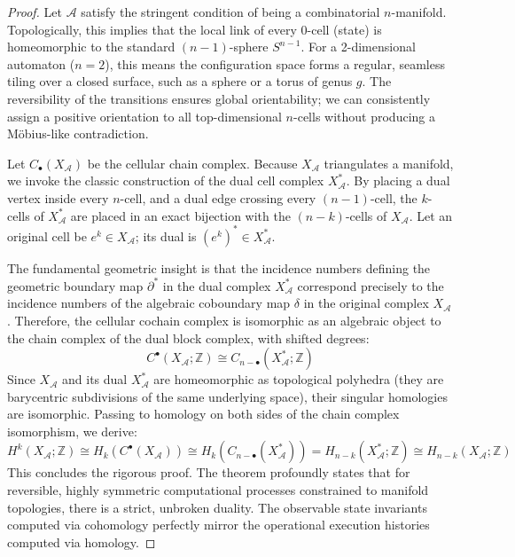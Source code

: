 \begin{proof}
Let $\mathcal{A}$ satisfy the stringent condition of being a combinatorial $n$-manifold. Topologically, this implies that the local link of every 0-cell (state) is homeomorphic to the standard $(n-1)$-sphere $S^{n-1}$. For a 2-dimensional automaton ($n=2$), this means the configuration space forms a regular, seamless tiling over a closed surface, such as a sphere or a torus of genus $g$. The reversibility of the transitions ensures global orientability; we can consistently assign a positive orientation to all top-dimensional $n$-cells without producing a Möbius-like contradiction.

Let $C_\bullet(X_\mathcal{A})$ be the cellular chain complex. Because $X_\mathcal{A}$ triangulates a manifold, we invoke the classic construction of the dual cell complex $X_\mathcal{A}^*$. By placing a dual vertex inside every $n$-cell, and a dual edge crossing every $(n-1)$-cell, the $k$-cells of $X_\mathcal{A}^*$ are placed in an exact bijection with the $(n-k)$-cells of $X_\mathcal{A}$. Let an original cell be $e^k \in X_\mathcal{A}$; its dual is $(e^k)^* \in X_\mathcal{A}^*$.

The fundamental geometric insight is that the incidence numbers defining the geometric boundary map $\partial^*$ in the dual complex $X_\mathcal{A}^*$ correspond precisely to the incidence numbers of the algebraic coboundary map $\delta$ in the original complex $X_\mathcal{A}$.
Therefore, the cellular cochain complex is isomorphic as an algebraic object to the chain complex of the dual block complex, with shifted degrees:
\[ C^\bullet(X_\mathcal{A}; \mathbb{Z}) \cong C_{n-\bullet}(X_\mathcal{A}^*; \mathbb{Z}) \]
Since $X_\mathcal{A}$ and its dual $X_\mathcal{A}^*$ are homeomorphic as topological polyhedra (they are barycentric subdivisions of the same underlying space), their singular homologies are isomorphic.
Passing to homology on both sides of the chain complex isomorphism, we derive:
\[ H^k(X_\mathcal{A}; \mathbb{Z}) \cong H_k(C^\bullet(X_\mathcal{A})) \cong H_k(C_{n-\bullet}(X_\mathcal{A}^*)) = H_{n-k}(X_\mathcal{A}^*; \mathbb{Z}) \cong H_{n-k}(X_\mathcal{A}; \mathbb{Z}) \]
This concludes the rigorous proof. The theorem profoundly states that for reversible, highly symmetric computational processes constrained to manifold topologies, there is a strict, unbroken duality. The observable state invariants computed via cohomology perfectly mirror the operational execution histories computed via homology.
\end{proof}

